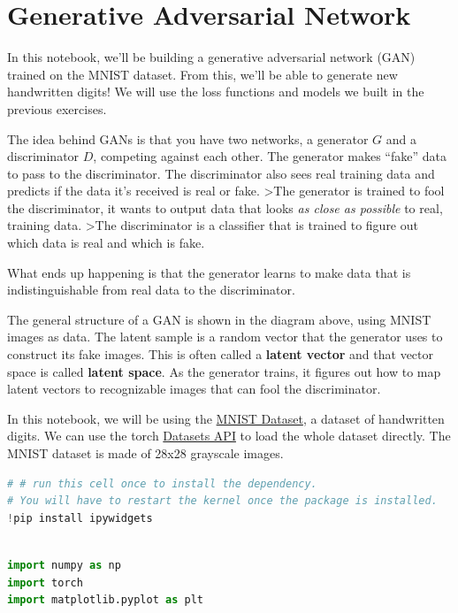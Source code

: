 \section{Generative Adversarial
Network}

In this notebook, we'll be building a generative adversarial network
(GAN) trained on the MNIST dataset. From this, we'll be able to generate
new handwritten digits! We will use the loss functions and models we
built in the previous exercises.

The idea behind GANs is that you have two networks, a generator \(G\)
and a discriminator \(D\), competing against each other. The generator
makes ``fake'' data to pass to the discriminator. The discriminator also
sees real training data and predicts if the data it's received is real
or fake. \textgreater* The generator is trained to fool the
discriminator, it wants to output data that looks \emph{as close as
possible} to real, training data. \textgreater* The discriminator is a
classifier that is trained to figure out which data is real and which is
fake.

What ends up happening is that the generator learns to make data that is
indistinguishable from real data to the discriminator.

The general structure of a GAN is shown in the diagram above, using
MNIST images as data. The latent sample is a random vector that the
generator uses to construct its fake images. This is often called a
\textbf{latent vector} and that vector space is called \textbf{latent
space}. As the generator trains, it figures out how to map latent
vectors to recognizable images that can fool the discriminator.

In this notebook, we will be using the
\href{http://yann.lecun.com/exdb/mnist/}{MNIST Dataset}, a dataset of
handwritten digits. We can use the torch
\href{https://pytorch.org/vision/stable/datasets.html}{Datasets API} to
load the whole dataset directly. The MNIST dataset is made of 28x28
grayscale images.

\begin{lstlisting}[language=Python]
# # run this cell once to install the dependency. 
# You will have to restart the kernel once the package is installed.
!pip install ipywidgets
\end{lstlisting}

\begin{lstlisting}[language=Python]
%matplotlib inline

import numpy as np
import torch
import matplotlib.pyplot as plt
\end{lstlisting}

